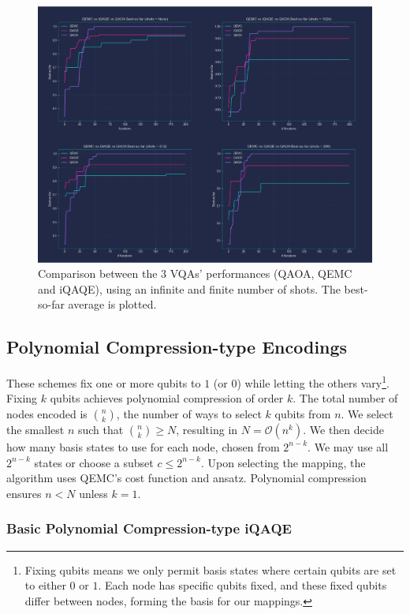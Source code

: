 \begin{figure}[t]
    \centering
    \includegraphics[width=\textwidth]{Figures/Random_iQAQE.png}
    \caption{Comparison between the $3$ VQAs' performances (QAOA, QEMC and iQAQE), using an infinite and finite number of shots. The best-so-far average is plotted.}
    \label{fig:3_Comparison_shots}
\end{figure}

\subsection{Polynomial Compression-type Encodings}
\label{subsection:Polynomial_Encodings}
These schemes fix one or more qubits to $1$ (or $0$) while letting the others vary\footnote{Fixing qubits means we only permit basis states where certain qubits are set to either $0$ or $1$. Each node has specific qubits fixed, and these fixed qubits differ between nodes, forming the basis for our mappings.}. Fixing $k$ qubits achieves polynomial compression of order $k$. The total number of nodes encoded is $\binom{n}{k}$, the number of ways to select $k$ qubits from $n$. We select the smallest $n$ such that $\binom{n}{k} \geq N$, resulting in $N = \mathcal{O}(n^k)$. We then decide how many basis states to use for each node, chosen from $2^{n-k}$. We may use all $2^{n-k}$ states or choose a subset $c \leq 2^{n-k}$. Upon selecting the mapping, the algorithm uses QEMC's cost function and ansatz. Polynomial compression ensures $n < N$ unless $k = 1$.

\subsubsection{Basic Polynomial Compression-type iQAQE}
\label{subsubsection:Basic_Polynomial_iQAQE}

